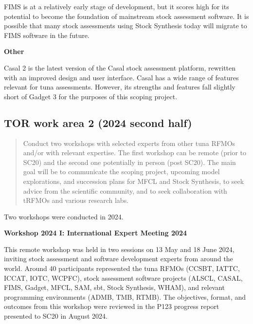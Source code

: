 \documentclass{SCreport}
\begin{document}
FIMS is at a relatively early stage of development, but it scores high for its
potential to become the foundation of mainstream stock assessment software. It
is possible that many stock assessments using Stock Synthesis today will migrate
to FIMS software in the future.

\vspace{1ex}

\textbf{Other}

\vspace{-1ex}

Casal 2 is the latest version of the Casal stock assessment platform, rewritten
with an improved design and user interface. Casal has a wide range of features
relevant for tuna assessments. However, its strengths and features fall slightly
short of Gadget 3 for the purposes of this scoping project.

\vspace{2ex}

\hypertarget{link:tor-2}{}
\subsection{TOR work area 2 (2024 second half)}
\label{sec:tor-2}

\begin{quote}\sf
  Conduct two workshops with selected experts from other tuna RFMOs and/or with
  relevant expertise. The first workshop can be remote (prior to SC20) and the
  second one potentially in person (post SC20). The main goal will be to
  communicate the scoping project, upcoming model explorations, and succession
  plans for MFCL and Stock Synthesis, to seek advice from the scientific
  community, and to seek collaboration with tRFMOs and various research labs.
\end{quote}

\vspace{2ex}

Two workshops were conducted in 2024.

\vspace{2ex}

\textbf{Workshop 2024 I: International Expert Meeting 2024}

This remote workshop was held in two sessions on 13 May and 18 June 2024,
inviting stock assessment and software development experts from around the
world. Around 40 participants represented the tuna RFMOs (CCSBT, IATTC, ICCAT,
IOTC, WCPFC), stock assessment software projects (ALSCL, CASAL, FIMS, Gadget,
MFCL, SAM, sbt, Stock Synthesis, WHAM), and relevant programming environments
(ADMB, TMB, RTMB). The objectives, format, and outcomes from this workshop were
reviewed in the P123 progress report presented to SC20 in August 2024.
\end{document}
